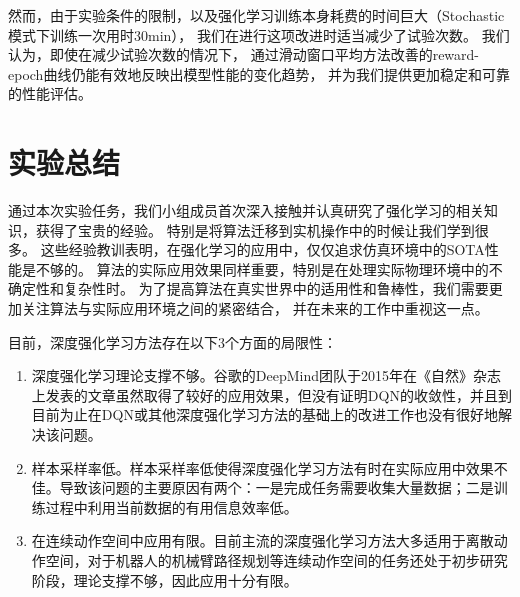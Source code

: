 \documentclass{thuemp}
\begin{document}
然而，由于实验条件的限制，以及强化学习训练本身耗费的时间巨大（Stochastic模式下训练一次用时30min），
我们在进行这项改进时适当减少了试验次数。
我们认为，即使在减少试验次数的情况下，
通过滑动窗口平均方法改善的reward-epoch曲线仍能有效地反映出模型性能的变化趋势，
并为我们提供更加稳定和可靠的性能评估。\\
\vbox{}

\section{实验总结}
通过本次实验任务，我们小组成员首次深入接触并认真研究了强化学习的相关知识，获得了宝贵的经验。
特别是将算法迁移到实机操作中的时候让我们学到很多。
这些经验教训表明，在强化学习的应用中，仅仅追求仿真环境中的SOTA性能是不够的。
算法的实际应用效果同样重要，特别是在处理实际物理环境中的不确定性和复杂性时。
为了提高算法在真实世界中的适用性和鲁棒性，我们需要更加关注算法与实际应用环境之间的紧密结合，
并在未来的工作中重视这一点。

目前，深度强化学习方法存在以下3个方面的局限性\cite{enderfga}：
\begin{enumerate}
  \item 深度强化学习理论支撑不够。谷歌的DeepMind团队于2015年在《自然》杂志上发表的文章虽然取得了较好的应用效果，但没有证明DQN的收敛性，并且到目前为止在DQN或其他深度强化学习方法的基础上的改进工作也没有很好地解决该问题。
  \item 样本采样率低。样本采样率低使得深度强化学习方法有时在实际应用中效果不佳。导致该问题的主要原因有两个：一是完成任务需要收集大量数据；二是训练过程中利用当前数据的有用信息效率低。
  \item 在连续动作空间中应用有限。目前主流的深度强化学习方法大多适用于离散动作空间，对于机器人的机械臂路径规划等连续动作空间的任务还处于初步研究阶段，理论支撑不够，因此应用十分有限。
\end{enumerate}
\end{document}
